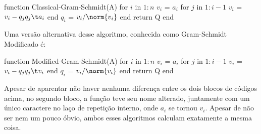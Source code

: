 

\begin{code}
function Classical-Gram-Schmidt(A)
    for $i$ in $1:n$
        $v_i$ = $a_i$
        for $j$ in $1:i-1$
            $v_i$ = $v_i - q_j q_j\t a_i$
        end
        $q_i$ = $v_i / \norm{v_i}$
    end
    return Q
end
\end{code}

Uma versão alternativa desse algoritmo, conhecida como Gram-Schmidt Modificado é:

\begin{code}
function Modified-Gram-Schmidt(A)
    for $i$ in $1:n$
        $v_i$ = $a_i$
        for $j$ in $1:i-1$
            $v_i$ = $v_i - q_j q_j\t v_i$
        end
        $q_i$ = $v_i / \norm{v_i}$
    end
    return Q
end
\end{code}

Apesar de aparentar não haver nenhuma diferença entre os dois blocos de códigos acima, no segundo bloco, a função teve seu nome alterado, juntamente com um único caractere no laço de repetição interno, onde $a_i$ se tornou $v_i$. Apesar de não ser nem um pouco óbvio, ambos esses algoritmos calculam exatamente a mesma coisa.